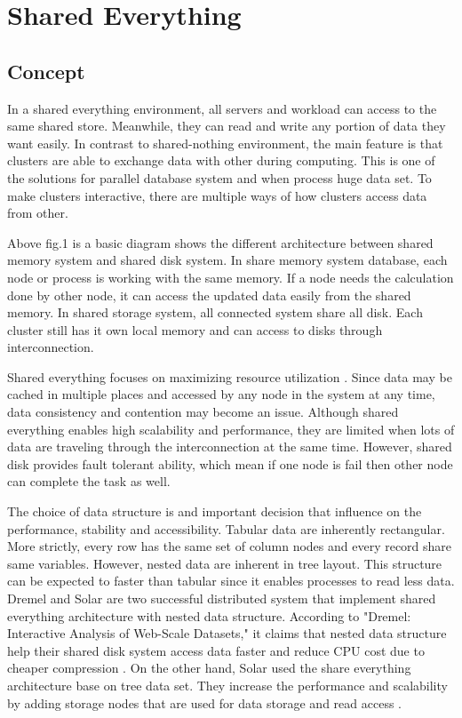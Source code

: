 \documentclass[onecolumn, draftclsnofoot,10pt, compsoc]{IEEEtran}
\begin{document}
	\newpage
	\tableofcontents
	\clearpage
	
	\section{Shared Everything}

    \subsection{Concept}
In a shared everything environment, all servers and workload can access to the same shared store.
Meanwhile, they can read and write any portion of data they want easily.
In contrast to shared-nothing environment, the main feature is that clusters are able to exchange data with other during computing.
This is one of the solutions for parallel database system and when process huge data set. 
To make clusters interactive, there are multiple ways of how clusters access data from other.

Above fig.1 is a basic diagram shows the different architecture between shared memory system and shared disk system. 
In share memory system database, each node or process is working with the same memory. 
If a node needs the calculation done by other node, it can access the updated data easily from the shared memory. 
In shared storage system, all connected system share all disk. 
Each cluster still has it own local memory and can access to disks through interconnection.

Shared everything focuses on maximizing resource utilization \cite{ClaussenBestofBoth}. 
Since data may be cached in multiple places and accessed by any node in the system at any time, data consistency and contention may become an issue.
Although shared everything enables high scalability and performance, they are limited when lots of data are traveling through the interconnection at the same time. 
However, shared disk provides fault tolerant ability, which mean if one node is fail then other node can complete the task as well.  

The choice of data structure is and important decision that influence on the performance, stability and accessibility.
Tabular data are inherently rectangular.
More strictly, every row has the same set of column nodes and every record share same variables.
However, nested data are inherent in tree layout.
This structure can be expected to faster than tabular since it enables processes to read less data.
Dremel and Solar are two successful distributed system that implement shared everything architecture with nested data structure.
According to "Dremel: Interactive Analysis of Web-Scale Datasets," it claims that nested data structure help their shared disk system access data faster and reduce CPU cost due to cheaper compression \cite{Dremel}.
On the other hand, Solar used the share everything architecture base on tree data set.
They increase the performance and scalability by adding storage nodes that are used for data storage and read access \cite{zhu2018solar}.  
\end{document}
